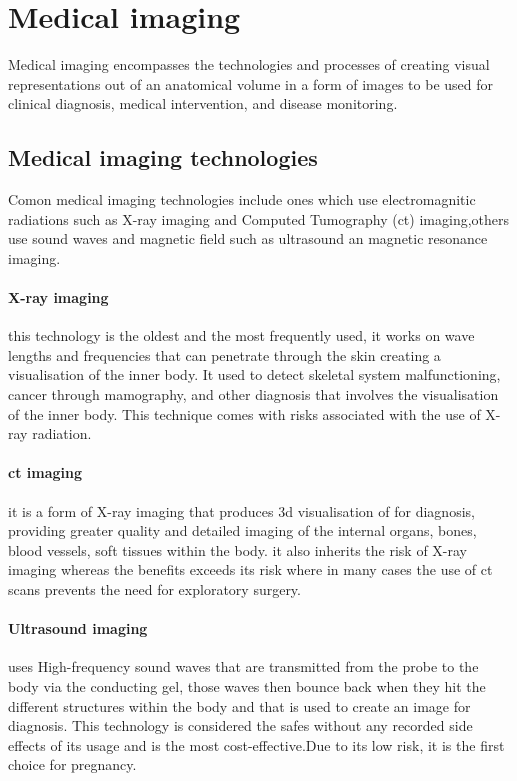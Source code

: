 \section{Medical imaging}
Medical imaging encompasses the technologies and processes of creating visual representations out of an anatomical volume in a form of images to be used for clinical diagnosis, medical intervention, and disease monitoring.
\subsection{Medical imaging technologies}
Comon medical imaging technologies include ones which use electromagnitic radiations such as X-ray imaging and Computed Tumography (\ac{ct}) imaging,others use sound waves and magnetic field such as ultrasound an magnetic resonance imaging.
\paragraph{X-ray imaging} this technology is the oldest and the most frequently used, it works on wave lengths and frequencies that can penetrate through the skin creating a visualisation of the inner body. It used to detect skeletal system malfunctioning, cancer through mamography, and other diagnosis that involves the visualisation of the inner body. This technique comes with risks associated with the use of X-ray radiation.
\paragraph{\ac{ct} imaging} it is a form of X-ray imaging that produces \ac{3d} visualisation of for diagnosis, providing greater quality and detailed imaging of the internal organs, bones, blood vessels, soft tissues within the body.
it also inherits the risk of X-ray imaging whereas the benefits exceeds its risk where in many cases the use of \ac{ct} scans prevents the need for exploratory surgery.
\paragraph{Ultrasound imaging} uses High-frequency sound waves that are transmitted from the probe to the body via the conducting gel, those waves then bounce back when they hit the different structures within the body and that is used to create an image for diagnosis.
This technology is considered the safes without any recorded side effects of its usage and is the most cost-effective.Due to its low risk, it is the first choice for pregnancy.
